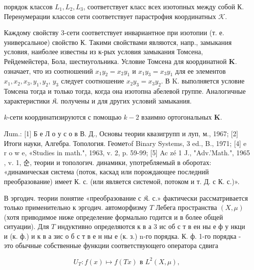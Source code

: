 \documentclass[10pt]{article}
\begin{document}
порядок классов $L_{1}, L_{2}, L_{3}$, соответствует класс всех изотопных между собой К. Перенумерации классов сети соответствует парастрофия координатных $\mathcal{K}$.



Каждому свойству 3-сети соответствует инвариантное при изотопии (т. е. универсальное) свойство К. Такими свойствами являются, напр., замыкания условия, наиболее известны из к-рых условия замыкания Томсена, Рейдемейстера, Бола, шестиугольника. Условие Томсена для координатной $\boldsymbol{K}$. означает, что из соотношений $x_{1} y_{2}=x_{2} y_{1}$ и $x_{1} y_{3}=x_{3} y_{1}$ для ее элементов $x_{1}, x_{2}, x_{3}, y_{1}, y_{2}$, $y_{3}$ следует соотношение $x_{2} y_{3}=x_{3} y_{2}$. В $\mathrm{K}$. выполняется условие Томсена тогда и только тогда, когда она изотопна абелевой группе. Аналогичные характеристики $\mathfrak{K}$. получены и для других условий замыкания.



$k$-сети координатизируются с помощью $k-2$ взаимно ортогональных $\boldsymbol{K}$.



Лum.: [1] Б е Л о у с о в В. Д., Основы теории квазигрупп и луп, м., 1967; [2] Итоги науки, Алгебра. Топология. Геометof Binary Systems, 3 ed., B., 1971; [4] e r o w e, «Studies in math.", 1963, v. 2, p. 59-99; [5] Ac zé 1 J., "Adv.'Math.", 1965 , v. 1, 순, теории и топологич. динамики, употребляемый в оборотах: «динамическая система (поток, каскад или порождающее последний преобразование) имеет К. с. (или является системой, потоком и т. Д. с К. с.)».



В эргодич. теории понятие «преобразование с $\mathfrak{K}$. с.» фактически рассматривается только применительно к эргодич. автоморфизму $T$ Лебега пространства $(X, \mu)$ (хотя приводимое ниже определение формально годится и в более общей ситуации). Для $T$ индуктивно определяются к в а 3 ис об с т в ен ны е ф у нкци и (к. ф.) и к в а зис о б с т в е н ны е (к. з.) n-го порядка. К. ф. 1-го порядка - это обычные собственные функции соответствующего оператора сдвига



\[

U_{T}: f(x) \mapsto f(T x) \text { в } L^{2}(X, \mu),

\]
\end{document}
